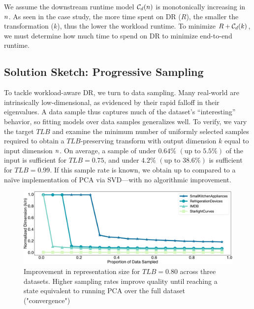 We assume the downstream runtime model $\mathcal{C}_{\color{black}d}({\color{black}n})$ is monotonically increasing in ${\color{black}n}$.
As seen in the case study, the more time spent on DR ($R$), the smaller the transformation ($k$), thus the lower the workload runtime.
To minimize $R + \mathcal{C}_{\color{black}d}(k)$, we must determine how much time to spend on DR to minimize end-to-end runtime.

\subsection{Solution Sketch: Progressive Sampling}
\label{sec:sampling}


To tackle workload-aware DR, we turn to data sampling. 
Many real-world  are intrinsically low-dimensional, as evidenced by their rapid falloff in their eigenvalues.
A data sample thus captures much of the dataset's ``interesting'' behavior, so fitting models over data samples generalizes well. 
To verify, we vary the target $TLB$ and examine the minimum number of uniformly selected samples required to obtain a $TLB$-preserving transform with output dimension $k$ equal to input dimension ${\color{black}n}$.
On average, a sample of under $0.64\%$ $(\text{up to } 5.5\%)$ of the input is sufficient for $TLB = 0.75$, and under $4.2\%$ $(\text{up to } 38.6\%)$ is sufficient for $TLB=0.99$.  
If this sample rate is known, we obtain up to  compared to a na\"ive implementation of PCA via SVD---with no algorithmic improvement. 

\begin{figure}
\includegraphics[width=\linewidth]{figs/progressive.pdf}
\caption[]{ Improvement in representation size for  $TLB = 0.80$ across three datasets. Higher sampling rates improve quality until reaching a state equivalent to running PCA over the full dataset ("convergence")}
\label{fig:progressive}
\end{figure}

